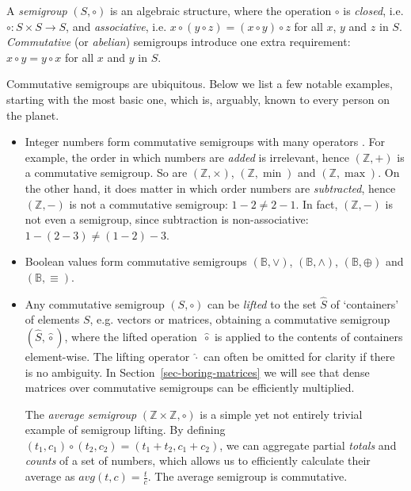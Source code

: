 \documentclass[11pt,letterpaper]{article}
\begin{document}
A \emph{semigroup} $(S, \circ)$ is an algebraic structure, where the operation
$\circ$ is \emph{closed}, i.e. $\circ : S\times S \rightarrow S$, and
\emph{associative}, i.e.
$x \circ (y \circ z) = (x \circ y) \circ z$ for all $x$, $y$ and $z$ in $S$.
\emph{Commutative} (or \emph{abelian}) semigroups introduce one extra
requirement: $x \circ y = y \circ x$ for all $x$ and $y$ in $S$.

Commutative semigroups are ubiquitous. Below we list a few
notable examples, starting with the most basic one, which is, arguably, known
to every person on the planet.

\begin{itemize}
  \item Integer numbers form commutative semigroups with many operators
  {}. For
  example, the order in which numbers are \emph{added} is irrelevant, hence
  $(\mathbb{Z}, +)$ is a commutative semigroup. So are $(\mathbb{Z}, \times)$,
  $(\mathbb{Z}, \min)$ and $(\mathbb{Z}, \max)$. On the other hand, it does
  matter in which order numbers are \emph{subtracted}, hence $(\mathbb{Z}, -)$
  is not a commutative semigroup: $1-2 \neq 2-1$. In fact, $(\mathbb{Z}, -)$
  is not even a semigroup, since subtraction is non-associative:
  $1-(2-3) \neq (1-2)-3$.

  \item Boolean values form commutative semigroups $(\mathbb{B}, \vee)$,
  $(\mathbb{B}, \wedge)$, $(\mathbb{B}, \oplus)$ and $(\mathbb{B}, \equiv)$.

  \item Any commutative semigroup $(S, \circ)$ can be \emph{lifted} to the set
  $\hat{S}$ of `containers' of elements $S$, e.g. vectors or matrices,
  obtaining a commutative semigroup $(\hat{S}, \hat{\circ})$, where the lifted
  operation~$\hat{\circ}$ is applied to the contents of containers element-wise.
  The lifting operator $\hat{\cdot}$
  {} 
  can often be omitted for clarity if there
  is no ambiguity. In Section~\ref{sec-boring-matrices} we will see that dense
  matrices over commutative semigroups can be efficiently multiplied.

  The \emph{average semigroup} $(\mathbb{Z} \times \mathbb{Z}, \circ)$ is a
  simple yet not entirely trivial example of semigroup lifting. By defining
  $(t_1, c_1) \circ (t_2, c_2) = (t_1 + t_2, c_1 + c_2)$, we can aggregate
  partial \emph{totals} and \emph{counts} of a set of numbers, which allows us
  to efficiently calculate their average as $\textit{avg}(t, c) = \frac{t}{c}$.
  The average semigroup is commutative.


\end{itemize}
\end{document}
